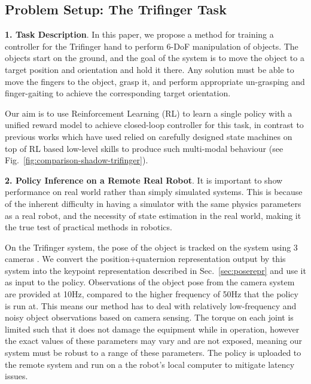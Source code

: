 \documentclass[letterpaper, 10 pt, conference]{ieeeconf}  %
\newcommand{\secref}[1]{Sec.~\ref{#1}}
\newcommand{\figref}[1]{Fig.~\ref{#1}}
\begin{document}
\subsection{Problem Setup: The Trifinger Task}
\label{sec:environment}
\vspace{-3pt}


\noindent \textbf{1. Task Description}.
In this paper, we propose a method for training a controller for the Trifinger hand \citep{trifinger-platform} to 
perform 6-DoF manipulation of objects. The objects start on the ground, and the goal of the system is to move the object to a target position and orientation and hold it there. Any solution must be able to move the fingers to the object, grasp it, and perform appropriate un-grasping and finger-gaiting to achieve the corresponding target orientation.

Our aim is to use Reinforcement Learning (RL) to learn a single policy with a unified reward model to achieve closed-loop controller for this task, in contrast to previous works which have used relied on carefully designed state machines on top of RL based low-level skills to produce such multi-modal behaviour (see \figref{fig:comparison-shadow-trifinger}). 

\noindent \textbf{2. Policy Inference on a Remote Real Robot}. It is important to show performance on real world rather than simply simulated systems. This is because of the inherent difficulty in having a simulator with the same physics parameters as a real robot, and the necessity of state estimation in the real world, making it the true test of practical methods in robotics.

On the Trifinger system, the pose of the object is tracked on the system using 3 cameras \citep{trifinger-object-tracking}. We convert the position+quaternion representation output by this system into the keypoint representation described in \secref{sec:poserepr} and use it as input to the policy. Observations of the object pose from the camera system are provided at 10Hz, compared to the higher frequency of 50Hz that the policy is run at. This means our method has to deal with relatively low-frequency and noisy object observations based on camera sensing. The torque on each joint is limited such that it does not damage the equipment while in operation, however the exact values of these parameters may vary and are not exposed, meaning our system must be robust to a range of these parameters. The policy is uploaded to the remote system and run on a the robot's local computer to mitigate latency issues.
\end{document}

